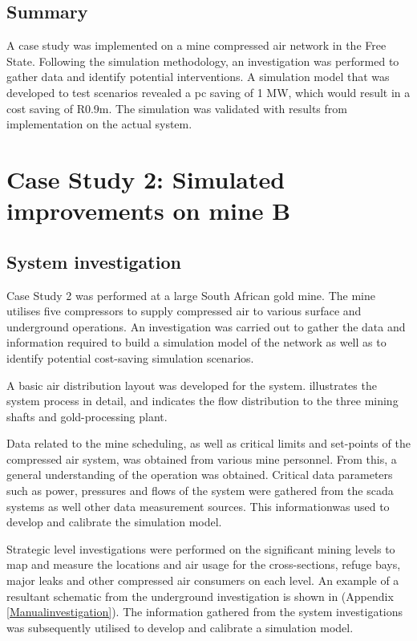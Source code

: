 \subsection{Summary}
A case study was implemented on a mine compressed air network in the Free State. Following the simulation methodology, an investigation was performed to gather data and identify potential interventions. A simulation model that was developed to test scenarios revealed a \gls{pc} saving of 1 MW, which would result in a cost saving of R0.9m. The simulation was validated with results from implementation on the actual system.
\section{Case Study 2: Simulated improvements on mine B}
	\subsection{System investigation}
	Case Study 2 was performed at a large South African gold mine. The mine utilises five compressors to supply compressed air to various surface and underground operations. An investigation was carried out to gather the data and information required to build a simulation model of the network as well as to identify potential cost-saving simulation scenarios.
	\par 
	A basic air distribution layout was developed for the system.  illustrates the system process in detail, and indicates the flow distribution to the three mining shafts and gold-processing plant.
	\par 
	Data related to the mine scheduling, as well as critical limits and  set-points of the compressed air system, was obtained from various mine personnel. From this, a general understanding of the operation was obtained.  Critical data parameters such as power, pressures and flows of the system were gathered from the \acrfull{scada} systems as well other data measurement sources. This informationwas used to develop and calibrate the simulation model.
	\par 
	Strategic level investigations were performed on the significant mining levels to map and measure the locations and air usage for the cross-sections, refuge bays, major leaks and other compressed air consumers on each level. An example of a resultant schematic from the underground investigation is shown in  (Appendix \ref{Manualinvestigation}). The information gathered from the system investigations was subsequently utilised to develop and calibrate a simulation model.
